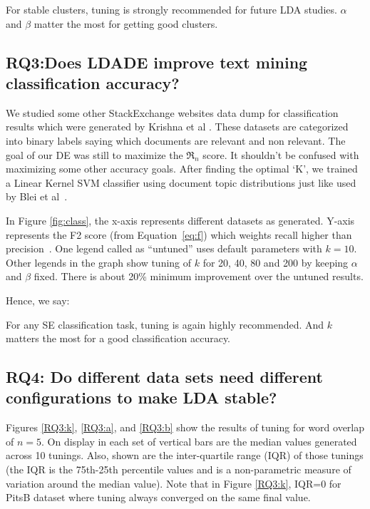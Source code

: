 \documentclass[twocolumn,5p,sort&compress]{elsarticle}
\newcommand{\eq}[1]{Equation~\ref{eq:#1}}
\theoremstyle{break}
\begin{document}
\begin{lesson}
For stable clusters, tuning is strongly recommended for future LDA studies. $\alpha$ and $\beta$ matter the most for getting good clusters.
\end{lesson}

\subsection{\textbf{RQ3:Does LDADE improve text mining classification accuracy?}}\label{sect:rq3} 

We studied some other StackExchange websites data dump for classification results which were generated by Krishna et al \cite{krishna2016bigse}. These datasets are categorized into binary labels saying which documents are relevant and non relevant. The goal of our DE was still to maximize the $\Re_n$ score. It shouldn't be confused with maximizing some other accuracy goals. After finding the optimal `K', we trained a Linear Kernel SVM classifier using document topic distributions just like used by Blei et al~\cite{blei2003latent}.

In Figure \ref{fig:class}, the x-axis represents different datasets as generated. Y-axis represents the F2 score
(from \eq{f}) which weights recall higher than precision~\cite{powers2011evaluation}. One legend called as ``untuned'' uses default parameters with $k=10$. Other legends in the graph show tuning of $k$ for 20, 40, 80 and 200 by keeping $\alpha$ and $\beta$ fixed. There is about 20\% minimum improvement over the untuned results.

\noindent
Hence, we say:

\begin{lesson}
For any SE classification task, tuning is again highly recommended. And $k$ matters the most for a good classification accuracy.
\end{lesson}

\subsection{\textbf{RQ4: Do different data sets
      need different configurations to make LDA stable?}}\label{sect:diff}

Figures \ref{RQ3:k}, \ref{RQ3:a}, and \ref{RQ3:b} show the results of tuning for word overlap of $n=5$.
On display in each set of vertical bars are
the median values generated across 10 tunings.
Also, shown are
the inter-quartile range (IQR) of those tunings (the IQR is the 75th-25th percentile values and is a non-parametric measure of variation
around the median value). Note that in Figure \ref{RQ3:k}, IQR=0 for  PitsB dataset where tuning
          always converged on the same final value.
\end{document}
